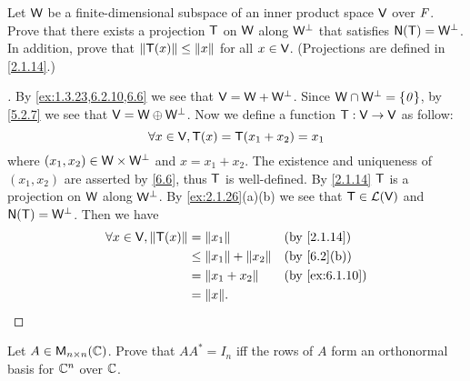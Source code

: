 \setcounter{ex}{9}
\begin{ex}\label{ex:6.2.10}
  Let \(\mathsf{W}\) be a finite-dimensional subspace of an inner product space \(\mathsf{V}\) over \(\mathit{F}\).
  Prove that there exists a projection \(\mathsf{T}\) on \(\mathsf{W}\) along \(\mathsf{W}^{\perp}\) that satisfies \(\ns{\T} = \W^{\perp}\).
  In addition, prove that \(\left\lVert\mathsf{T}(x)\right\rVert \leq \left\lVert x\right\rVert\) for all \(x \in \mathsf{V}\).
  (Projections are defined in \cref{2.1.14}.)
\end{ex}

\begin{proof}[]
  By \cref{ex:1.3.23,6.2.10,6.6} we see that \(\mathsf{V} = \mathsf{W} + \mathsf{W}^{\perp}\).
  Since \(\mathsf{W} \cap \mathsf{W}^{\perp} = \left\lbrace\mathit{0}\right\rbrace\), by \cref{5.2.7} we see that \(\mathsf{V} = \mathsf{W} \oplus \mathsf{W}^{\perp}\).
  Now we define a function \(\mathsf{T} : \mathsf{V} \to \mathsf{V}\) as follow:
  \[
    \forall x \in \mathsf{V}, \mathsf{T}(x) = \mathsf{T}(x_1 + x_2) = x_1
  \]
  where \((x_1, x_2) \in \mathsf{W} \times \mathsf{W}^{\perp}\) and \(x = x_1 + x_2\).
  The existence and uniqueness of \((x_1, x_2)\) are asserted by \cref{6.6}, thus \(\mathsf{T}\) is well-defined.
  By \cref{2.1.14} \(\mathsf{T}\) is a projection on \(\mathsf{W}\) along \(\mathsf{W}^{\perp}\).
  By \cref{ex:2.1.26}(a)(b) we see that \(\mathsf{T} \in \mathcal{L}(\mathsf{V})\) and \(\ns{\T} = \W^{\perp}\).
  Then we have
  \begin{align*}
    \forall x \in \V, \norm{\T(x)} & = \norm{x_1}                 &  & \by{2.1.14}    \\
                                   & \leq \norm{x_1} + \norm{x_2} &  & \by{6.2}[b]    \\
                                   & = \norm{x_1 + x_2}           &  & \by{ex:6.1.10} \\
                                   & = \norm{x}.
  \end{align*}
\end{proof}

\begin{ex}\label{ex:6.2.11}
  Let \(A \in \ms[n][n][\C]\).
  Prove that \(AA^* = I_n\) iff the rows of \(A\) form an orthonormal basis for \(\mathbb{C}^n\) over \(\mathbb{C}\).
\end{ex}


